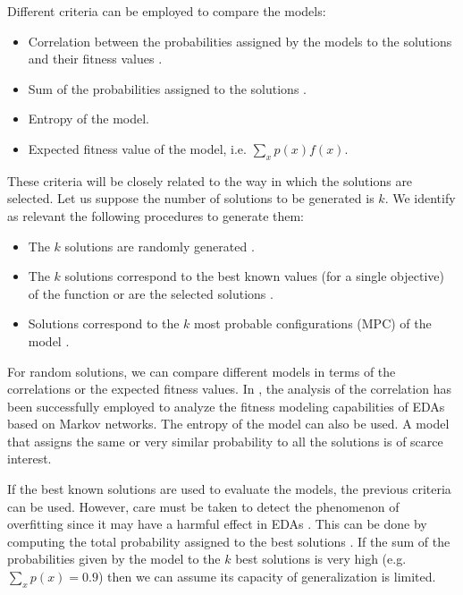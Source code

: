 \documentclass[a4paper]{article}
\begin{document}
Different criteria can be employed to compare the models:

\begin{itemize}
  \item Correlation between the probabilities assigned by the models to
  the solutions and their fitness values \cite{Brownlee_et_al:2008}.
  \item Sum of the probabilities assigned to the solutions \cite{Santana:2002}.
  \item Entropy of the model.
  \item Expected fitness value of the model, i.e. $\sum_x p(x)f(x)$.
\end{itemize}

These criteria will be closely related to the way in which the
solutions are selected. Let us suppose the number of solutions to be
generated is $k$. We identify as relevant the following procedures
to generate them:

\begin{itemize}
  \item The $k$ solutions are randomly generated \cite{Brownlee_et_al:2008}.
  \item The $k$ solutions correspond to the best known values (for a single objective) of the function
or are the selected solutions \cite{Santana:2002,Brownlee_et_al:2008}.
  \item Solutions correspond to the $k$ most probable configurations (MPC) of
  the model \cite{Echegoyen_et_al:2009}.
\end{itemize}

 For random solutions, we can compare different models in terms of
 the correlations or the expected fitness values. In \cite{Brownlee_et_al:2008}, the
 analysis of the correlation has been successfully
employed to analyze the fitness modeling capabilities of EDAs based on Markov networks.
  The entropy of the model can also be  used. A model that assigns the same or very
 similar probability to all the solutions is of scarce interest.

 If the best known solutions are used to evaluate the models, the previous criteria can be used.
 However, care must be taken to detect the phenomenon of overfitting since it may have a harmful
 effect in EDAs \cite{Lima_et_al:2008,Santana:2002,Santana:2005}.
 This can be done by computing the total probability assigned to the best solutions \cite{Santana:2002}.
 If the sum of the probabilities given by the
 model to the $k$ best solutions is very high (e.g. $\sum_x p(x) =
 0.9$) then we can assume its capacity of generalization is limited.
\end{document}
